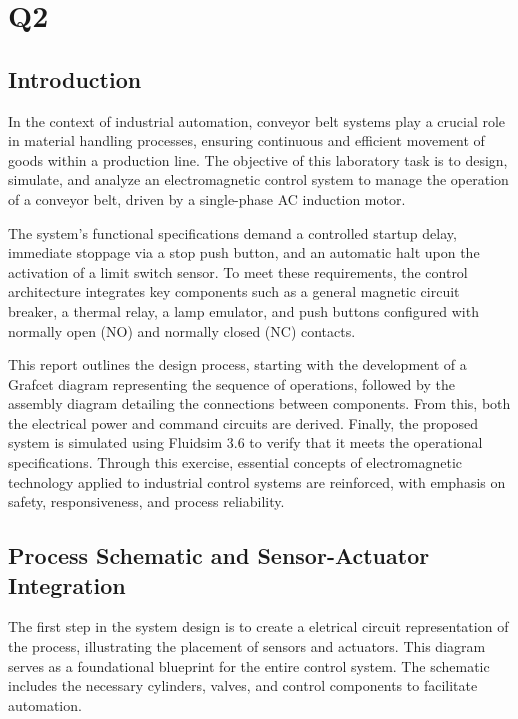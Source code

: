 \section{Q2} 

\subsection{Introduction} \label{sec:Introduction}

In the context of industrial automation, conveyor belt systems play a crucial role in material handling processes, 
ensuring continuous and efficient movement of goods within a production line. The objective of this laboratory task 
is to design, simulate, and analyze an electromagnetic control system to manage the operation of a conveyor belt, 
driven by a single-phase AC induction motor.

The system's functional specifications demand a controlled startup delay, immediate stoppage via a stop push 
button, and an automatic halt upon the activation of a limit switch sensor. To meet these requirements, the 
control architecture integrates key components such as a general magnetic circuit breaker, a thermal relay, 
a lamp emulator, and push buttons configured with normally open (NO) and normally closed (NC) contacts.

This report outlines the design process, starting with the development of a Grafcet diagram representing the 
sequence of operations, followed by the assembly diagram detailing the connections between components. From this, 
both the electrical power and command circuits are derived. Finally, the proposed system is simulated using 
Fluidsim 3.6 to verify that it meets the operational specifications. Through this exercise, essential concepts 
of electromagnetic technology applied to industrial control systems are reinforced, with emphasis on safety, 
responsiveness, and process reliability.

\subsection{Process Schematic and Sensor-Actuator Integration} \label{sec:Process_Schematic_and_Sensor-Actuator_Integration}

The first step in the system design is to create a eletrical circuit representation of the process, 
illustrating the placement of sensors and actuators. This diagram serves as a foundational blueprint 
for the entire control system. The schematic includes the necessary cylinders, valves, and control 
components to facilitate automation.

